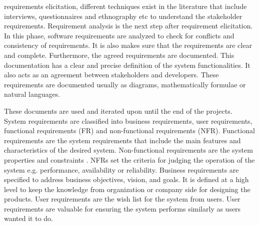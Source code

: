 requirements elicitation, different techniques exist in the literature that
include interviews, questionnaires and ethnography etc to understand the
stakeholder requirements.
Requirement analysis \cite{Nuseibeh:2000} is the next step
after requirement elicitation. In this phase, software requirements are analyzed
to check for conflicts and consistency of requirements. It is also makes sure
that the requirements are clear and complete.
Furthermore, the agreed requirements are documented. This documentation has a clear and precise
definition of the system functionalities. It also acts as an agreement between
stakeholders and developers. These requirements are documented usually as diagrams, mathematically
formulae or natural languages.

These documents are used and iterated upon until the end of the projects.
System requirements are classified into business requirements, user
requirements, functional requirements (FR) and non-functional requirements (NFR). Functional
requirements are the system requirements that include the main features and
characteristics of the desired system. Non-functional requirements are the
system properties and constraints \cite{Davis:1993, Glinz}. NFRs set the
criteria for judging the operation of the system e.g.
performance, availability or reliability. Business requirements are specified to
address business objectives, vision, and goals. It is defined at a high level to
keep the knowledge from organization or company side for designing the products.
User requirements are the wish list for the system from users.
User requirements are valuable for ensuring the system performs similarly as users wanted it to do.
